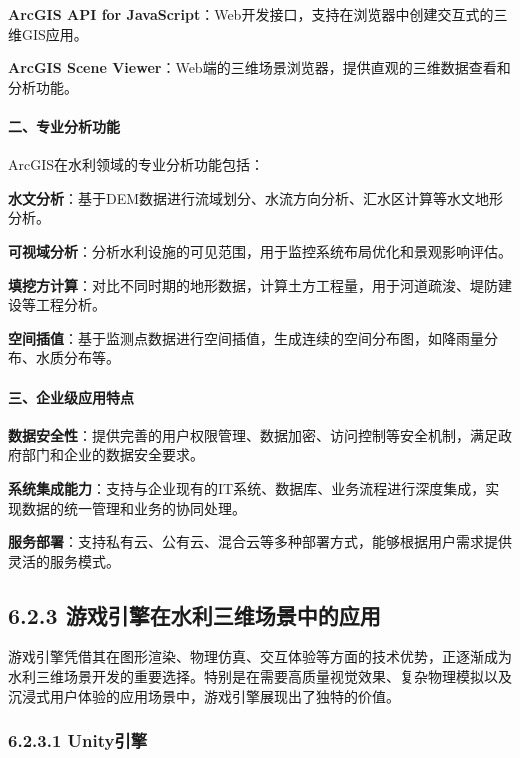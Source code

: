 \textbf{ArcGIS API for
JavaScript}：Web开发接口，支持在浏览器中创建交互式的三维GIS应用。

\textbf{ArcGIS Scene
Viewer}：Web端的三维场景浏览器，提供直观的三维数据查看和分析功能。

\paragraph{二、专业分析功能}\label{ux4e8cux4e13ux4e1aux5206ux6790ux529fux80fd}

ArcGIS在水利领域的专业分析功能包括：

\textbf{水文分析}：基于DEM数据进行流域划分、水流方向分析、汇水区计算等水文地形分析。

\textbf{可视域分析}：分析水利设施的可见范围，用于监控系统布局优化和景观影响评估。

\textbf{填挖方计算}：对比不同时期的地形数据，计算土方工程量，用于河道疏浚、堤防建设等工程分析。

\textbf{空间插值}：基于监测点数据进行空间插值，生成连续的空间分布图，如降雨量分布、水质分布等。

\paragraph{三、企业级应用特点}\label{ux4e09ux4f01ux4e1aux7ea7ux5e94ux7528ux7279ux70b9}

\textbf{数据安全性}：提供完善的用户权限管理、数据加密、访问控制等安全机制，满足政府部门和企业的数据安全要求。

\textbf{系统集成能力}：支持与企业现有的IT系统、数据库、业务流程进行深度集成，实现数据的统一管理和业务的协同处理。

\textbf{服务部署}：支持私有云、公有云、混合云等多种部署方式，能够根据用户需求提供灵活的服务模式。

\subsection{6.2.3
游戏引擎在水利三维场景中的应用}\label{ux6e38ux620fux5f15ux64ceux5728ux6c34ux5229ux4e09ux7ef4ux573aux666fux4e2dux7684ux5e94ux7528}

游戏引擎凭借其在图形渲染、物理仿真、交互体验等方面的技术优势，正逐渐成为水利三维场景开发的重要选择。特别是在需要高质量视觉效果、复杂物理模拟以及沉浸式用户体验的应用场景中，游戏引擎展现出了独特的价值。

\subsubsection{6.2.3.1 Unity引擎}\label{unityux5f15ux64ce}

